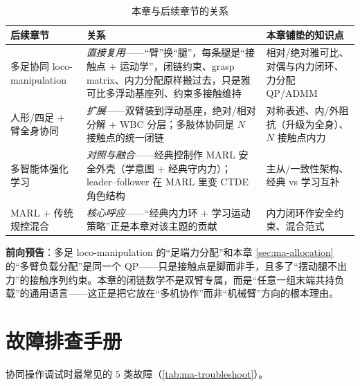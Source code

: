 \begin{table}[H]\centering\small
\caption{本章与后续章节的关系}
\label{tab:ma-relations}
\begin{tabular}{p{3.4cm}p{5.6cm}p{4.4cm}}
\toprule
后续章节 & 关系 & 本章铺垫的知识点 \\
\midrule
多足协同 loco-manipulation & \emph{直接复用}——“臂”换“腿”，每条腿是“接触点 $+$ 运动学”，闭链约束、grasp matrix、内力分配原样搬过去，只是雅可比多浮动基座列、约束多接触维持 & 相对/绝对雅可比、对偶与内力闭环、力分配 QP/ADMM \\
人形/四足 $+$ 臂全身协同 & \emph{扩展}——双臂装到浮动基座，绝对/相对分解 $+$ WBC 分层；多肢体协同是 $N$ 接触点的统一闭链 & 对称表述、内/外阻抗（升级为全身）、$N$ 接触点内力 \\
多智能体强化学习 & \emph{对照与融合}——经典控制作 MARL 安全外壳（学意图 $+$ 经典守内力）；leader--follower 在 MARL 里变 CTDE 角色结构 & 主从/一致性架构、经典 vs 学习互补 \\
MARL $+$ 传统规控混合 & \emph{核心呼应}——“经典内力环 $+$ 学习运动策略”正是本章对该主题的贡献 & 内力闭环作安全约束、混合范式 \\
\bottomrule
\end{tabular}
\end{table}

\noindent\textbf{前向预告}：多足 loco-manipulation 的“足端力分配”和本章 \cref{sec:ma-allocation} 的“多臂负载分配”是同一个 QP——只是接触点是脚而非手，且多了“摆动腿不出力”的接触序列约束。本章的闭链数学不是双臂专属，而是“任意一组末端共持负载”的通用语言——这正是把它放在“多机协作”而非“机械臂”方向的根本理由。

\section*{故障排查手册}
协同操作调试时最常见的 $5$ 类故障（\cref{tab:ma-troubleshoot}）。

